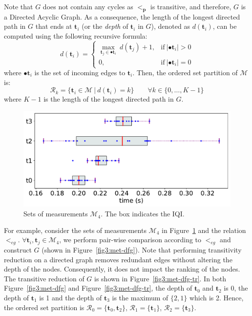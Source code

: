 \documentclass[acmsmall,screen, review]{acmart}
\begin{document}
Note that $G$ does not contain any cycles as $<_{\mathbf{p}}$ is transitive,
 and therefore, $G$ is a Directed Acyclic Graph. As a consequence,  the length of the longest directed path in $G$ that ends at $\mathbf{t}_i$ (or the \textit{depth} of $\mathbf{t}_i$ in $G$), denoted as $d(\mathbf{t}_i)$,  can be computed using the following recursive formula:
\begin{equation}
d(\mathbf{t}_i) = 
\begin{cases}
\underset{\mathbf{t}_j \in \bullet \mathbf{t}_i}{\max }  \ d(\mathbf{t}_j) + 1, & \text{if} \ |\bullet \mathbf{t}_i| > 0 \\
0, & \text{if}  \ |\bullet \mathbf{t}_i| = 0
\end{cases}
\end{equation}
where $\bullet \mathbf{t}_i$ is the set of incoming edges to $\mathbf{t}_i$. Then, the ordered set partition of $\mathcal{M}$ is:
\begin{equation}
\label{eq:rank-hesse}
\mathcal{R}_k = \{\mathbf{t}_i \in \mathcal{M}\ | \  d(\mathbf{t}_i) = k \} \qquad \forall k \in \{0, \dots, K-1\}
\end{equation}
where  $K-1$ is the length of the longest directed path in $G$. 

\begin{figure}[h!]
	\centering
	\includegraphics[width=0.6\linewidth]{fig/ch3/valid-3}
	\caption{Sets of measurements $\mathcal{M}_4$. The box indicates the IQI.}
	\label{fig3:met-eg}
\end{figure}

For example, consider the sets of measurements $\mathcal{M}_4$ in Figure~\ref{fig3:met-eg} and the relation $<_{eg}$. $\forall \mathbf{t}_i, \mathbf{t}_j \in \mathcal{M}_4$, we perform pair-wise comparison according to $<_{eg}$ and construct $G$ (shown in Figure~\ref{fig3:met-dfg}).  Note that performing transitivity reduction on a directed graph removes redundant edges without altering the depth of the nodes.  Consequently, it does not impact the ranking of the nodes. The transitive reduction of $G$ is shown in Figure~\ref{fig3:met-dfg-tr}. In both Figure~\ref{fig3:met-dfg} and Figure~\ref{fig3:met-dfg-tr},
the depth of $\mathbf{t}_0$ and $\mathbf{t}_2$ is 0, the depth of $\mathbf{t}_1$ is 1 and the depth of $\mathbf{t}_3$ is the maximum of $\{2,1\}$ which is 2. Hence, the ordered set partition is $\mathcal{R}_0 = \{\mathbf{t}_0, \mathbf{t}_2\}$, $\mathcal{R}_1 = \{ \mathbf{t}_1\}$, $\mathcal{R}_2 = \{\mathbf{t}_3\}$.
\end{document}
